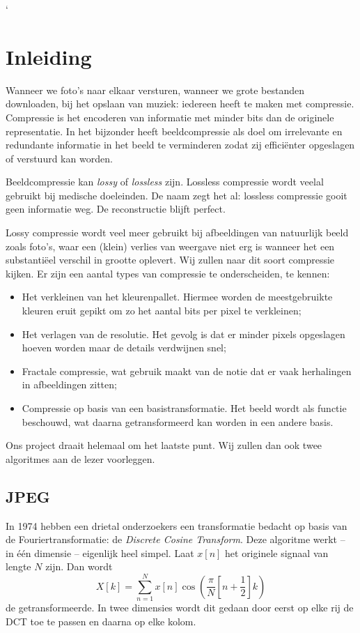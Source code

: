 \documentclass[11pt]{uvamath}
\theoremstyle{plain}
\theoremstyle{definition}
\theoremstyle{remark}
\begin{document}
\tableofcontents
\newpage
`
\chapter*{Inleiding}
Wanneer we foto's naar elkaar versturen, wanneer we grote bestanden downloaden, bij het opslaan van muziek: iedereen heeft te maken met compressie. Compressie is het encoderen van informatie met minder bits dan de originele representatie. In het bijzonder heeft beeldcompressie als doel om irrelevante en redundante informatie in het beeld te verminderen zodat zij effici\"enter opgeslagen of verstuurd kan worden.

Beeldcompressie kan \emph{lossy} of \emph{lossless} zijn. Lossless compressie wordt veelal gebruikt bij medische doeleinden. De naam zegt het al: lossless compressie gooit geen informatie weg. De reconstructie blijft perfect.

Lossy compressie wordt veel meer gebruikt bij afbeeldingen van natuurlijk beeld zoals foto's, waar een (klein) verlies van weergave niet erg is wanneer het een substanti\"eel verschil in grootte oplevert. Wij zullen naar dit soort compressie kijken. Er zijn een aantal types van compressie te onderscheiden, te kennen:
\begin{itemize}
	\item Het verkleinen van het kleurenpallet. Hiermee worden de meestgebruikte kleuren eruit gepikt om zo het aantal bits per pixel te verkleinen;
	\item Het verlagen van de resolutie. Het gevolg is dat er minder pixels opgeslagen hoeven worden maar de details verdwijnen snel;
	\item Fractale compressie, wat gebruik maakt van de notie dat er vaak herhalingen in afbeeldingen zitten;
	\item Compressie op basis van een basistransformatie. Het beeld wordt als functie beschouwd, wat daarna getransformeerd kan worden in een andere basis.
\end{itemize}
Ons project draait helemaal om het laatste punt. Wij zullen dan ook twee algoritmes aan de lezer voorleggen.

\section*{JPEG}
In 1974 hebben een drietal onderzoekers een transformatie bedacht op basis van de Fouriertransformatie: de \emph{Discrete Cosine Transform}. Deze algoritme werkt -- in \'e\'en dimensie -- eigenlijk heel simpel. Laat $x[n]$ het originele signaal van lengte $N$ zijn. Dan wordt
\[
	X[k] = \sum_{n=1}^N x[n] \cos\left(\frac{\pi}{N}\left[ n + \frac{1}{2}\right]k\right)
\]
de getransformeerde. In twee dimensies wordt dit gedaan door eerst op elke rij de DCT toe te passen en daarna op elke kolom.
\end{document}
